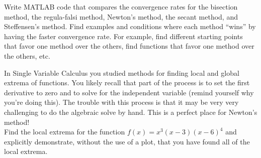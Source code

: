 \begin{problem}
    Write MATLAB code that compares the convergence rates for the bisection method, the
    regula-falsi method, Newton's method, the secant method, and Steffensen's method. Find examples
    and conditions where each method ``wins'' by having the faster convergence rate.  For
    example, find different starting points that favor one method over the others, find
    functions that favor one method over the others, etc.
\end{problem}


\begin{problem}
    In Single Variable Calculus you studied methods for finding local and global extrema
    of functions. You likely recall that part of the process is to set the first
    derivative to zero and to solve for the independent variable (remind yourself why
    you're doing this).  The trouble with this process is that it may be very very
    challenging to do the algebraic solve by hand.  This is a perfect place for Newton's
    method! \\
    Find the local extrema for the function $f(x) = x^3(x-3)(x-6)^4$ and explicitly
    demonstrate, without the use of a plot, that you have found all of the local extrema.
\end{problem}


